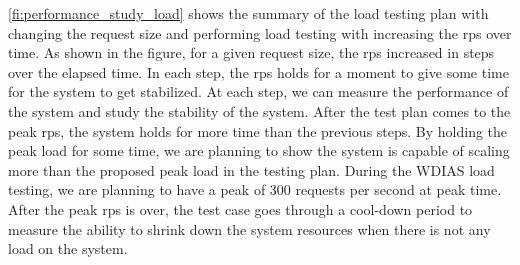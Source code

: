 \cref{fi:performance_study_load} shows the summary of the load testing plan with changing the request size and performing load testing with increasing the \acrshort{rps} over time. As shown in the figure, for a given request size, the \acrshort{rps} increased in steps over the elapsed time. In each step, the \acrshort{rps} holds for a moment to give some time for the system to get stabilized. At each step, we can measure the performance of the system and study the stability of the system. After the test plan comes to the peak \acrshort{rps}, the system holds for more time than the previous steps. By holding the peak load for some time, we are planning to show the system is capable of scaling more than the proposed peak load in the testing plan. During the WDIAS load testing, we are planning to have a peak of 300 requests per second at peak time. After the peak \acrshort{rps} is over, the test case goes through a cool-down period to measure the ability to shrink down the system resources when there is not any load on the system.

